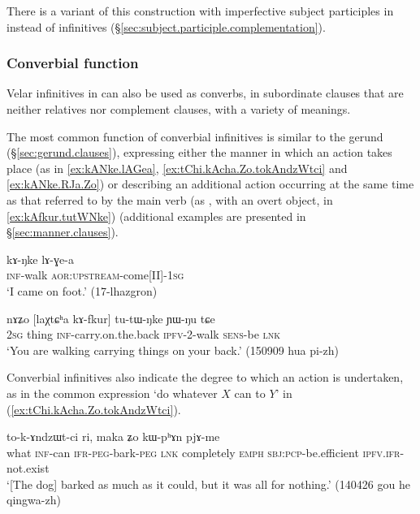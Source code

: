 There is a variant of this construction with imperfective subject participles in  instead of infinitives (§\ref{sec:subject.participle.complementation}). 

\subsubsection{Converbial function}    \label{sec:inf.converb}
Velar infinitives in  can also be used as converbs, in subordinate clauses that are neither relatives nor complement clauses, with a variety of meanings.

The most common function of converbial infinitives is similar to the gerund (§\ref{sec:gerund.clauses}), expressing either the manner in which an action takes place (as in \ref{ex:kANke.lAGea}, \ref{ex:tChi.kAcha.Zo.tokAndzWtci} and \ref{ex:kANke.RJa.Zo}) or describing an additional action occurring at the same time as that referred to by the main verb (as , with an overt object, in \ref{ex:kAfkur.tutWNke}) (additional examples are presented in §\ref{sec:manner.clauses}).

\begin{exe}
\ex \label{ex:kANke.lAGea}
\gll  kɤ-ŋke lɤ-ɣe-a \\
\textsc{inf}-walk  \textsc{aor}:\textsc{upstream}-come[II]-\textsc{1sg} \\
\glt `I came on foot.' (17-lhazgron)
\end{exe}

\begin{exe}
\ex \label{ex:kAfkur.tutWNke}
\gll nɤʑo [laχtɕʰa kɤ-fkur] tu-tɯ-ŋke ɲɯ-ŋu tɕe \\
\textsc{2sg} thing \textsc{inf}-carry.on.the.back \textsc{ipfv}-2-walk \textsc{sens}-be \textsc{lnk} \\
\glt `You are walking carrying things on your back.' (150909 hua pi-zh)
\end{exe}

Converbial infinitives also indicate the degree to which an action is undertaken, as in the common expression  `do whatever $X$ can to $Y$' in (\ref{ex:tChi.kAcha.Zo.tokAndzWtci}).

\begin{exe}
\ex \label{ex:tChi.kAcha.Zo.tokAndzWtci}
 to-k-ɤndzɯt-ci ri, maka ʑo kɯ-pʰɤn pjɤ-me \\
what \textsc{inf}-can  \textsc{ifr}-\textsc{peg}-bark-\textsc{peg}  \textsc{lnk} completely \textsc{emph} \textsc{sbj}:\textsc{pcp}-be.efficient \textsc{ipfv}.\textsc{ifr}-not.exist \\
\glt `[The dog] barked as much as it could, but it was all for nothing.'  (140426 gou he qingwa-zh)
\end{exe}

